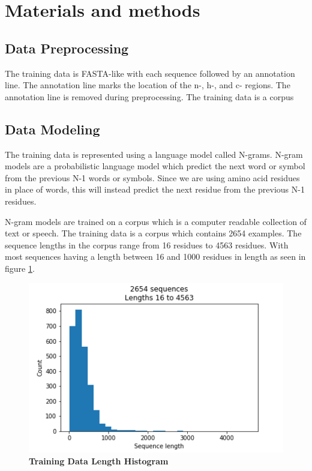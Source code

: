 \documentclass[10pt,letterpaper]{article}
\begin{document}
	\section*{Materials and methods}
	\subsection*{Data Preprocessing}
	The training data is FASTA-like with each sequence followed by an annotation line.  The annotation line marks the location of the n-, h-, and c- regions. The annotation line is removed during preprocessing. The training data is a corpus
	
	\subsection*{Data Modeling}
	The training data is represented using a language model called N-grams. N-gram models are a probabilistic language model which predict the next word or symbol from the previous N-1 words or symbols. Since we are using amino acid residues in place of words, this will instead predict the next residue from the previous N-1 residues. 

	N-gram models are trained on a corpus which is a computer readable collection of text or speech\cite{jurafsky}. The training data is a corpus which contains 2654 examples. The sequence lengths in the corpus range from 16 residues to 4563 residues. With most sequences having a length between 16 and 1000 residues in length as seen in figure \ref{fig:sequence-hist}. 
	
	\begin{figure}[!h]
		\centering
		\includegraphics[scale=0.5, width=\textwidth]{sequence-hist}
		\caption{{\bf Training Data Length Histogram}}
		\label{fig:sequence-hist}
	\end{figure}
	
\end{document}
